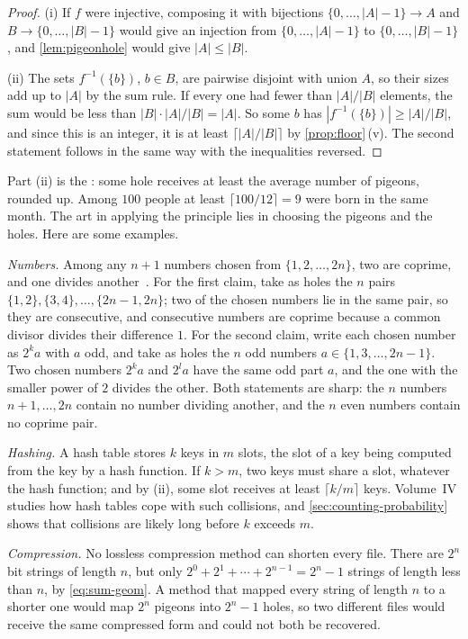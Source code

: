 \begin{proof}
(i) If $f$ were injective, composing it with bijections $\{0,\ldots,|A|-1\}\to A$ and $B\to\{0,\ldots,|B|-1\}$ would give an injection from $\{0,\ldots,|A|-1\}$ to $\{0,\ldots,|B|-1\}$, and \cref{lem:pigeonhole} would give $|A|\le|B|$.

(ii) The sets $f^{-1}(\{b\})$, $b\in B$, are pairwise disjoint with union $A$, so their sizes add up to $|A|$ by the sum rule. If every one had fewer than $|A|/|B|$ elements, the sum would be less than $|B|\cdot|A|/|B|=|A|$. So some $b$ has $|f^{-1}(\{b\})|\ge|A|/|B|$, and since this is an integer, it is at least $\lceil|A|/|B|\rceil$ by \cref{prop:floor}\,(v). The second statement follows in the same way with the inequalities reversed.
\end{proof}

Part (ii) is the : some hole receives at least the average number of pigeons, rounded up. Among $100$ people at least $\lceil100/12\rceil=9$ were born in the same month. The art in applying the principle lies in choosing the pigeons and the holes. Here are some examples.

\emph{Numbers.} Among any $n+1$ numbers chosen from $\{1,2,\ldots,2n\}$, two are coprime, and one divides another~\cite{aigner2018proofs}. For the first claim, take as holes the $n$ pairs $\{1,2\},\{3,4\},\ldots,\{2n-1,2n\}$; two of the chosen numbers lie in the same pair, so they are consecutive, and consecutive numbers are coprime because a common divisor divides their difference $1$. For the second claim, write each chosen number as $2^ka$ with $a$ odd, and take as holes the $n$ odd numbers $a\in\{1,3,\ldots,2n-1\}$. Two chosen numbers $2^ka$ and $2^la$ have the same odd part $a$, and the one with the smaller power of $2$ divides the other. Both statements are sharp: the $n$ numbers $n+1,\ldots,2n$ contain no number dividing another, and the $n$ even numbers contain no coprime pair.

\emph{Hashing.} A hash table stores $k$ keys in $m$ slots, the slot of a key being computed from the key by a hash function. If $k>m$, two keys must share a slot, whatever the hash function; and by (ii), some slot receives at least $\lceil k/m\rceil$ keys. Volume~IV studies how hash tables cope with such collisions, and \cref{sec:counting-probability} shows that collisions are likely long before $k$ exceeds $m$.

\emph{Compression.} No lossless compression method can shorten every file. There are $2^n$ bit strings of length $n$, but only $2^0+2^1+\cdots+2^{n-1}=2^n-1$ strings of length less than $n$, by \eqref{eq:sum-geom}. A method that mapped every string of length $n$ to a shorter one would map $2^n$ pigeons into $2^n-1$ holes, so two different files would receive the same compressed form and could not both be recovered.

